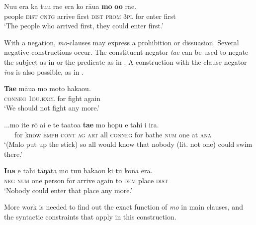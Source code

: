 \ea\label{ex:11.160}
\gll Nu{\ꞌ}u era ka tu{\ꞌ}u ra{\ꞌ}e era ko rāua \textbf{mo} \textbf{o{\ꞌ}o} ra{\ꞌ}e. \\
people \textsc{dist} \textsc{cntg} arrive first \textsc{dist} \textsc{prom} \textsc{3pl} for enter first \\

\glt 
‘The people who arrived first, they could enter first.’ \textstyleExampleref{[R250.071]} 
\z

With a negation, \textit{mo}{}-clauses may express a prohibition or dissuasion. Several negative constructions occur. The constituent negator \textit{ta{\ꞌ}e} can be used to negate the subject as in  or the predicate as in . A construction with the clause negator \textit{{\ꞌ}ina} is also possible, as in .

\ea\label{ex:11.161}
\gll \textbf{Ta{\ꞌ}e} māua mo moto haka{\ꞌ}ou. \\
\textsc{conneg} \textsc{1du.excl} for fight again \\

\glt 
‘We should not fight any more.’ \textstyleExampleref{[R211.014]} 
\z

\ea\label{ex:11.162}
\gll ...mo {\ꞌ}ite rō {\ꞌ}ai e te ta{\ꞌ}ato{\ꞌ}a \textbf{ta{\ꞌ}e} mo hopu e tahi {\ꞌ}i ira.\\
~~~for know \textsc{emph} \textsc{cont} \textsc{ag} \textsc{art} all \textsc{conneg} for bathe \textsc{num} one at \textsc{ana}\\

\glt 
‘(Malo put up the stick) so all would know that nobody (lit. not one) could swim there.’ \textstyleExampleref{[R108.030]} 
\z

\ea\label{ex:11.163}
\gll \textbf{{\ꞌ}Ina} e tahi taŋata mo tu{\ꞌ}u haka{\ꞌ}ou ki tū kona era. \\
\textsc{neg} \textsc{num} one person for arrive again to \textsc{dem} place \textsc{dist} \\

\glt
‘Nobody could enter that place any more.’ \textstyleExampleref{[R310.158]}\textstyleExampleref{} 
\z

More work is needed to find out the exact function of \textit{mo} in main clauses, and the syntactic constraints that apply in this construction.

